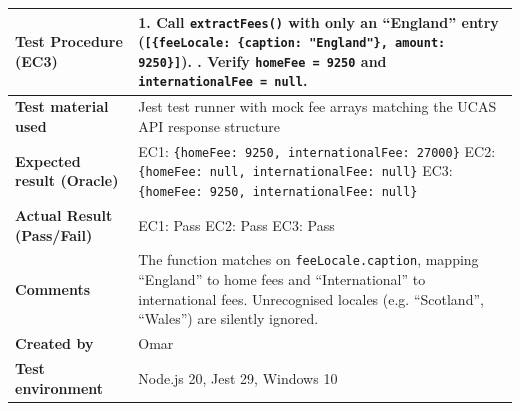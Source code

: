 \begin{table}[h!]
\begin{tabular}{|p{}|p{}|}
\textbf{Test Procedure (EC3)} & 1. Call \texttt{extractFees()} with only an ``England'' entry (\texttt{[\{feeLocale: \{caption: "England"\}, amount: 9250\}]}). \newline 2. Verify \texttt{homeFee = 9250} and \texttt{internationalFee = null}. \\ \hline
\textbf{Test material used} & Jest test runner with mock fee arrays matching the UCAS API response structure \\ \hline
\textbf{Expected result (Oracle)} & EC1: \texttt{\{homeFee: 9250, internationalFee: 27000\}} \newline EC2: \texttt{\{homeFee: null, internationalFee: null\}} \newline EC3: \texttt{\{homeFee: 9250, internationalFee: null\}} \\ \hline
\textbf{Actual Result (Pass/Fail)} & EC1: Pass \newline EC2: Pass \newline EC3: Pass \\ \hline
\textbf{Comments} & The function matches on \texttt{feeLocale.caption}, mapping ``England'' to home fees and ``International'' to international fees. Unrecognised locales (e.g. ``Scotland'', ``Wales'') are silently ignored. \\ \hline
\textbf{Created by} & Omar \\ \hline
\textbf{Test environment} & Node.js 20, Jest 29, Windows 10 \\ \hline
\end{tabular}
\end{table}

